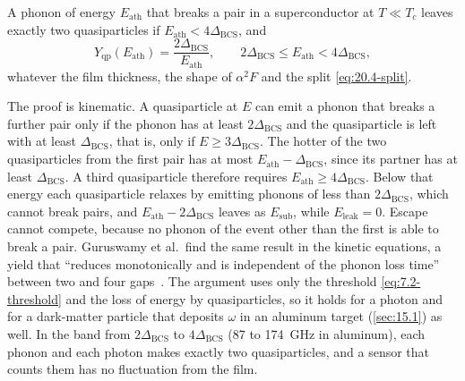 \begin{keyresult}
A phonon of energy $E_{\mathrm{ath}}$ that breaks a pair in a superconductor at $T \ll T_c$ leaves exactly two quasiparticles if $E_{\mathrm{ath}} < 4\Delta_{\mathrm{BCS}}$, and
\begin{equation}
  Y_{\mathrm{qp}}(E_{\mathrm{ath}}) = \frac{2\Delta_{\mathrm{BCS}}}{E_{\mathrm{ath}}} , \qquad 2\Delta_{\mathrm{BCS}} \le E_{\mathrm{ath}} < 4\Delta_{\mathrm{BCS}} ,
  \label{eq:20.4-below}
\end{equation}
whatever the film thickness, the shape of $\alpha^2F$ and the split \cref{eq:20.4-split}.
\end{keyresult}
\noindent The proof is kinematic. A quasiparticle at $E$ can emit a phonon that breaks a further pair only if the phonon has at least $2\Delta_{\mathrm{BCS}}$ and the quasiparticle is left with at least $\Delta_{\mathrm{BCS}}$, that is, only if $E \ge 3\Delta_{\mathrm{BCS}}$. The hotter of the two quasiparticles from the first pair has at most $E_{\mathrm{ath}} - \Delta_{\mathrm{BCS}}$, since its partner has at least $\Delta_{\mathrm{BCS}}$. A third quasiparticle therefore requires $E_{\mathrm{ath}} \ge 4\Delta_{\mathrm{BCS}}$. Below that energy each quasiparticle relaxes by emitting phonons of less than $2\Delta_{\mathrm{BCS}}$, which cannot break pairs, and $E_{\mathrm{ath}} - 2\Delta_{\mathrm{BCS}}$ leaves as $E_{\mathrm{sub}}$, while $E_{\mathrm{leak}} = 0$. Escape cannot compete, because no phonon of the event other than the first is able to break a pair. Guruswamy et al.\ find the same result in the kinetic equations, a yield that ``reduces monotonically and is independent of the phonon loss time'' between two and four gaps~\cite[p.~5]{guruswamy2014quasiparticle}. The argument uses only the threshold \cref{eq:7.2-threshold} and the loss of energy by quasiparticles, so it holds for a photon and for a dark-matter particle that deposits $\omega$ in an aluminum target (\cref{sec:15.1}) as well. In the band from $2\Delta_{\mathrm{BCS}}$ to $4\Delta_{\mathrm{BCS}}$ (87 to \SI{174}{GHz} in aluminum), each phonon and each photon makes exactly two quasiparticles, and a sensor that counts them has no fluctuation from the film.

